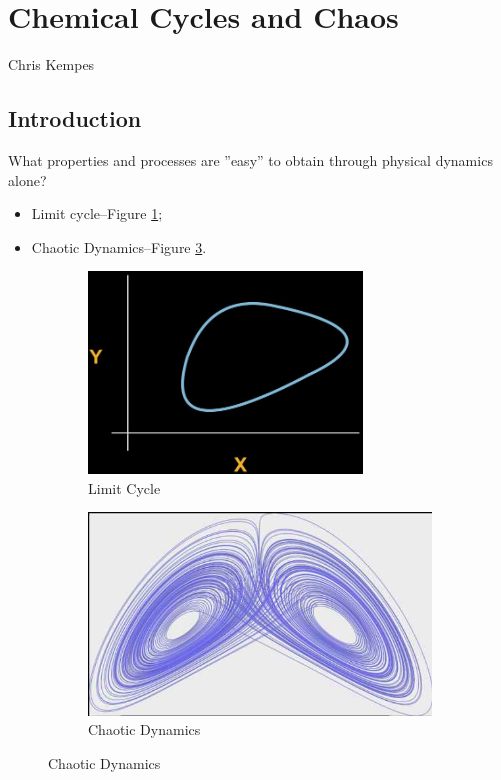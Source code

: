 \documentclass[]{article}
\begin{document}
{\cite[19.S, Nucleic Acids (Summary)]{brown2009chemistry} 
\cite{xu2020selective,bhowmik2019role}
\section{Chemical Cycles and Chaos}

Chris Kempes

\subsection{Introduction}

What properties and processes are ''easy'' to obtain through physical dynamics alone?
\begin{itemize}
	\item Limit cycle--Figure \ref{fig:LimitCycle};
	\item Chaotic Dynamics--Figure \ref{fig:ChaoticDynamics}.
\end{itemize}

\begin{figure}[H]
	\caption{Processes that are easy to obtain through physical dynamics alone}
	\begin{subfigure}[t]{0.45\textwidth}
		\caption{Limit Cycle}\label{fig:LimitCycle}
		\includegraphics[width=0.8\textwidth]{LimitCycle}
	\end{subfigure}
	\begin{subfigure}[t]{0.45\textwidth}
		\caption{Chaotic Dynamics}\label{fig:ChaoticDynamics}
		\includegraphics[width=\textwidth]{ChaoticDynamics}
	\end{subfigure}
\end{figure}

}
\end{document}

